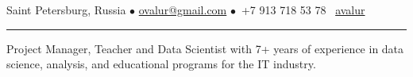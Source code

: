 \documentclass[11pt]{article}
\begin{document}
%

\vspace{0.5em}

\noindent Saint Petersburg, Russia $\bullet$ \href{mailto:ovalur@gmail.com}{ovalur@gmail.com} %
$\bullet$~+7 913 718 53 78
\faGithub~\href{https://github.com/avalur}{avalur}

\vspace{0.5em}
\hrule
\vspace{0.5em}

Project Manager, Teacher and Data Scientist with 7+ years of experience in data science, analysis, and educational programs for the IT industry.

\vspace{0.5em}
\end{document}
